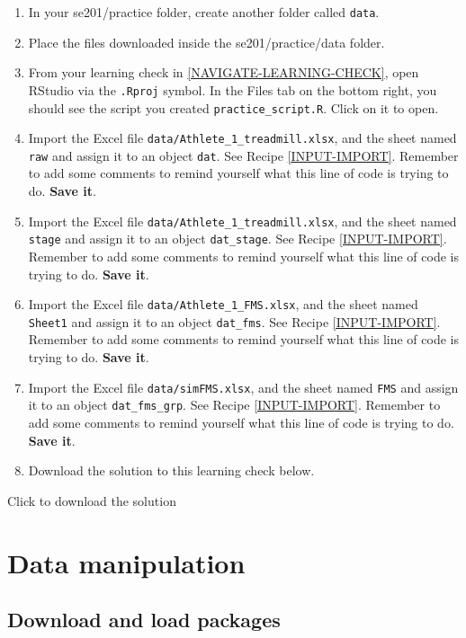 \documentclass[
]{book}
\begin{document}
\begin{enumerate}
\def\labelenumi{\arabic{enumi}.}
\item
  In your se201/practice folder, create another folder called \texttt{data}.
\item
  Place the files downloaded inside the se201/practice/data folder.
\item
  From your learning check in \ref{NAVIGATE-LEARNING-CHECK}, open RStudio via the \texttt{.Rproj} symbol. In the Files tab on the bottom right, you should see the script you created \texttt{practice\_script.R}. Click on it to open.
\item
  Import the Excel file \texttt{data/Athlete\_1\_treadmill.xlsx}, and the sheet named \texttt{raw} and assign it to an object \texttt{dat}. See Recipe \ref{INPUT-IMPORT}. Remember to add some comments to remind yourself what this line of code is trying to do. \textbf{Save it}.
\item
  Import the Excel file \texttt{data/Athlete\_1\_treadmill.xlsx}, and the sheet named \texttt{stage} and assign it to an object \texttt{dat\_stage}. See Recipe \ref{INPUT-IMPORT}. Remember to add some comments to remind yourself what this line of code is trying to do. \textbf{Save it}.
\item
  Import the Excel file \texttt{data/Athlete\_1\_FMS.xlsx}, and the sheet named \texttt{Sheet1} and assign it to an object \texttt{dat\_fms}. See Recipe \ref{INPUT-IMPORT}. Remember to add some comments to remind yourself what this line of code is trying to do. \textbf{Save it}.
\item
  Import the Excel file \texttt{data/simFMS.xlsx}, and the sheet named \texttt{FMS} and assign it to an object \texttt{dat\_fms\_grp}. See Recipe \ref{INPUT-IMPORT}. Remember to add some comments to remind yourself what this line of code is trying to do. \textbf{Save it}.
\item
  Download the solution to this learning check below.
\end{enumerate}

Click to download the solution

\hypertarget{WRANGLE}{%
\chapter{Data manipulation}\label{WRANGLE}}

\hypertarget{download-and-load-packages-3}{%
\section*{Download and load packages}\label{download-and-load-packages-3}}
\end{document}

